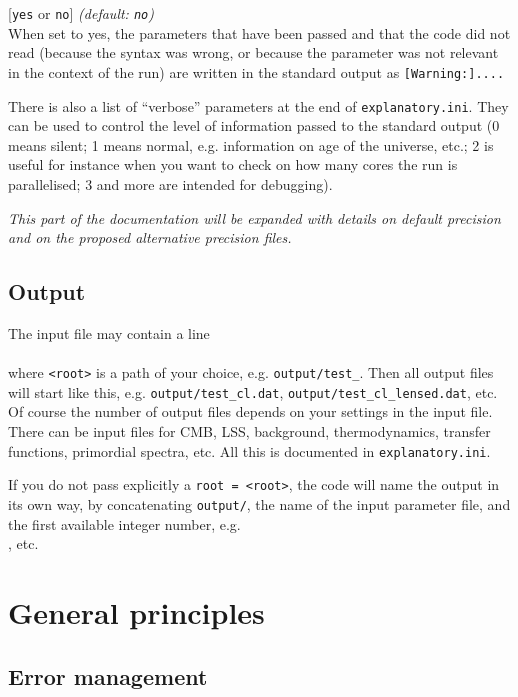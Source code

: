 \documentclass{article}
\begin{document}
 [{\tt yes} or {\tt no}] {\it (default: {\tt no})}\\

When set to yes, the parameters  that have been passed and that the code did not read 
(because the syntax was wrong, or because the parameter was not relevant in the context of the run) are written
in the standard output as {\tt [Warning:]....}

There is also a list of ``verbose'' parameters at the end of {\tt explanatory.ini}. They can be used to control
the level of information passed to the standard output (0 means silent; 1 means normal, e.g. information on age of the universe, etc.; 2 is useful for instance when you want to check on how many cores the run is parallelised; 3 and more are intended for debugging).

{\it This part of the documentation will be expanded with details on default precision and on the proposed alternative precision files.}

\subsection{Output}

The input file may contain a line\\

\\

\noindent where {\tt <root>} is a path of your choice, e.g. {\tt output/test\_}.
Then all output files will start like this, e.g. {\tt output/test\_cl.dat}, {\tt output/test\_cl\_lensed.dat}, etc.
Of course the number of output files depends on your settings in the input file. There can be input files for CMB, LSS, background, thermodynamics, transfer functions, primordial spectra, etc. All this is documented in {\tt explanatory.ini}.

If you do not pass explicitly a {\tt root = <root>}, the code will name the output in its own way, by concatenating {\tt output/}, the name of the input parameter file, and the first available integer number, e.g.\\

, etc.

\section{General principles}

\subsection{Error management}
\end{document}
